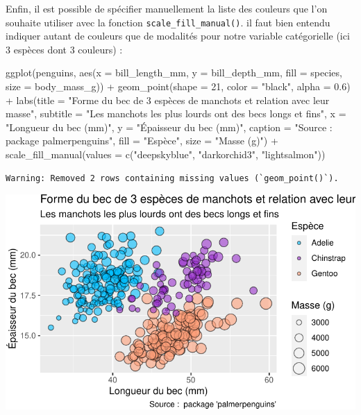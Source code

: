 \documentclass[
  a4paper,
  DIV=11,
  numbers=noendperiod,
  oneside]{scrreprt}
\newenvironment{Shaded}{}{}
\newcommand{\AttributeTok}[1]{\textcolor[rgb]{0.84,0.23,0.29}{#1}}
\newcommand{\DecValTok}[1]{\textcolor[rgb]{0.00,0.36,0.77}{#1}}
\newcommand{\FloatTok}[1]{\textcolor[rgb]{0.00,0.36,0.77}{#1}}
\newcommand{\FunctionTok}[1]{\textcolor[rgb]{0.44,0.26,0.76}{#1}}
\newcommand{\NormalTok}[1]{\textcolor[rgb]{0.14,0.16,0.18}{#1}}
\newcommand{\SpecialCharTok}[1]{\textcolor[rgb]{0.00,0.36,0.77}{#1}}
\newcommand{\StringTok}[1]{\textcolor[rgb]{0.01,0.18,0.38}{#1}}
\begin{document}
Enfin, il est possible de spécifier manuellement la liste des couleurs
que l'on souhaite utiliser avec la fonction
\texttt{scale\_fill\_manual()}. il faut bien entendu indiquer autant de
couleurs que de modalités pour notre variable catégorielle (ici 3
espèces dont 3 couleurs) :

\begin{Shaded}
\begin{Highlighting}[]
\FunctionTok{ggplot}\NormalTok{(penguins, }\FunctionTok{aes}\NormalTok{(}\AttributeTok{x =}\NormalTok{ bill\_length\_mm, }\AttributeTok{y =}\NormalTok{ bill\_depth\_mm,}
                     \AttributeTok{fill =}\NormalTok{ species, }\AttributeTok{size =}\NormalTok{ body\_mass\_g)) }\SpecialCharTok{+}
  \FunctionTok{geom\_point}\NormalTok{(}\AttributeTok{shape =} \DecValTok{21}\NormalTok{, }\AttributeTok{color =} \StringTok{"black"}\NormalTok{, }\AttributeTok{alpha =} \FloatTok{0.6}\NormalTok{) }\SpecialCharTok{+}
  \FunctionTok{labs}\NormalTok{(}\AttributeTok{title =} \StringTok{"Forme du bec de 3 espèces de manchots et relation avec leur masse"}\NormalTok{,}
       \AttributeTok{subtitle =} \StringTok{"Les manchots les plus lourds ont des becs longs et fins"}\NormalTok{,}
       \AttributeTok{x =} \StringTok{"Longueur du bec (mm)"}\NormalTok{,}
       \AttributeTok{y =} \StringTok{"Épaisseur du bec (mm)"}\NormalTok{,}
       \AttributeTok{caption =} \StringTok{"Source :  package \textquotesingle{}palmerpenguins\textquotesingle{}"}\NormalTok{,}
       \AttributeTok{fill =} \StringTok{"Espèce"}\NormalTok{,}
       \AttributeTok{size =} \StringTok{"Masse (g)"}\NormalTok{) }\SpecialCharTok{+}
  \FunctionTok{scale\_fill\_manual}\NormalTok{(}\AttributeTok{values =} \FunctionTok{c}\NormalTok{(}\StringTok{"deepskyblue"}\NormalTok{, }\StringTok{"darkorchid3"}\NormalTok{, }\StringTok{"lightsalmon"}\NormalTok{))}
\end{Highlighting}
\end{Shaded}

\begin{verbatim}
Warning: Removed 2 rows containing missing values (`geom_point()`).
\end{verbatim}

\includegraphics{03-visualization_files/figure-pdf/unnamed-chunk-101-1.pdf}
\end{document}
